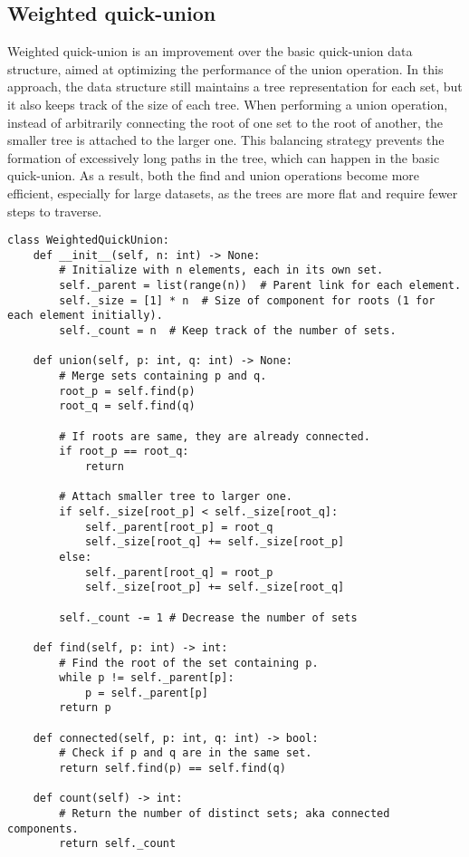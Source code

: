 \documentclass{article}
\begin{document}
\subsection{Weighted quick-union}

Weighted quick-union is an improvement over the basic quick-union data structure, aimed at optimizing the performance of the union operation. In this approach, the data structure still maintains a tree representation for each set, but it also keeps track of the size of each tree. When performing a union operation, instead of arbitrarily connecting the root of one set to the root of another, the smaller tree is attached to the larger one. This balancing strategy prevents the formation of excessively long paths in the tree, which can happen in the basic quick-union. As a result, both the find and union operations become more efficient, especially for large datasets, as the trees are more flat and require fewer steps to traverse.

\begin{verbatim}
class WeightedQuickUnion:
    def __init__(self, n: int) -> None:
        # Initialize with n elements, each in its own set.
        self._parent = list(range(n))  # Parent link for each element.
        self._size = [1] * n  # Size of component for roots (1 for each element initially).
        self._count = n  # Keep track of the number of sets.

    def union(self, p: int, q: int) -> None:
        # Merge sets containing p and q.
        root_p = self.find(p)
        root_q = self.find(q)

        # If roots are same, they are already connected.
        if root_p == root_q:
            return

        # Attach smaller tree to larger one.
        if self._size[root_p] < self._size[root_q]:
            self._parent[root_p] = root_q
            self._size[root_q] += self._size[root_p]
        else:
            self._parent[root_q] = root_p
            self._size[root_p] += self._size[root_q]
            
        self._count -= 1 # Decrease the number of sets
        
    def find(self, p: int) -> int:
        # Find the root of the set containing p.
        while p != self._parent[p]:
            p = self._parent[p]
        return p

    def connected(self, p: int, q: int) -> bool:
        # Check if p and q are in the same set.
        return self.find(p) == self.find(q)
    
    def count(self) -> int:
        # Return the number of distinct sets; aka connected components.
        return self._count
\end{verbatim}
\end{document}
